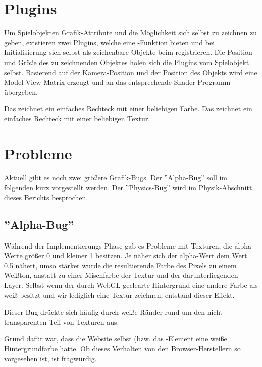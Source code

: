 \section{Plugins}

Um Spielobjekten Grafik-Attribute und die Möglichkeit sich selbst zu zeichnen zu geben, existieren zwei Plugins, welche eine -Funktion bieten und bei Initialisierung sich selbst als zeichenbare Objekte beim  registrieren. Die Position und Größe des zu zeichnenden Objektes holen sich die Plugins vom Spielobjekt selbst. Basierend auf der Kamera-Position und der Position des Objekts wird eine Model-View-Matrix erzeugt und an das entsprechende Shader-Programm übergeben.

Das  zeichnet ein einfaches Rechteck mit einer beliebigen Farbe. Das  zeichnet ein einfaches Rechteck mit einer beliebigen Textur.

\section{Probleme}

Aktuell gibt es noch zwei größere Grafik-Bugs. Der ''Alpha-Bug'' soll im folgenden kurz vorgestellt werden. Der ''Physics-Bug'' wird im Physik-Abschnitt dieses Berichts besprochen.

\subsection{''Alpha-Bug''}

Während der Implementierungs-Phase gab es Probleme mit Texturen, die alpha-Werte größer 0 und kleiner 1 besitzen. Je näher sich der alpha-Wert dem Wert 0.5 nähert, umso stärker wurde die resultierende Farbe des Pixels zu einem Weißton, anstatt zu einer Mischfarbe der Textur und der darunterliegenden Layer. Selbst wenn der durch WebGL geclearte Hintergrund eine andere Farbe als weiß besitzt und wir lediglich eine Textur zeichnen, entstand dieser Effekt.


Dieser Bug drückte sich häufig durch weiße Ränder rund um den nicht-transparenten Teil von Texturen aus.

Grund dafür war, dass die Website selbst (bzw. das -Element eine weiße Hintergrundfarbe hatte. Ob dieses Verhalten von den Browser-Herstellern so vorgesehen ist, ist fragwürdig.